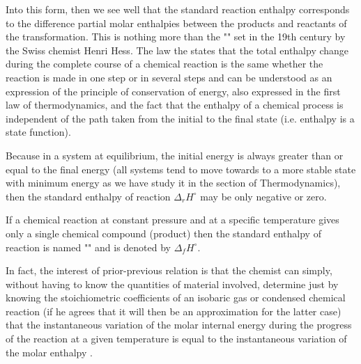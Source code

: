 	Into this form, then we see well that the standard reaction enthalpy corresponds to the difference partial molar enthalpies between the products and reactants of the transformation. This is nothing more than the "" set in the 19th century by the Swiss chemist Henri Hess. The law the states that the total enthalpy change during the complete course of a chemical reaction is the same whether the reaction is made in one step or in several steps and can be understood as an expression of the principle of conservation of energy, also expressed in the first law of thermodynamics, and the fact that the enthalpy of a chemical process is independent of the path taken from the initial to the final state (i.e. enthalpy is a state function).

	Because in a system at equilibrium, the initial energy is always greater than or equal to the final energy (all systems tend to move towards to a more stable state with minimum energy as we have study it in the section of Thermodynamics), then the standard enthalpy of reaction $\Delta_r H^\circ$ may be only negative or zero.

	If a chemical reaction at constant pressure and at a specific temperature gives only a single chemical compound (product) then the standard enthalpy of reaction is named  "" and is denoted by $\Delta_f H^\circ$.

	In fact, the interest of prior-previous relation is that the chemist can simply, without having to know the quantities of material involved, determine just by knowing the stoichiometric coefficients of an isobaric  gas or condensed chemical reaction (if he agrees that it will then be an approximation for the latter case) that the instantaneous variation of the molar internal energy during the progress of the reaction at a given temperature is equal to the instantaneous variation of the molar enthalpy .

